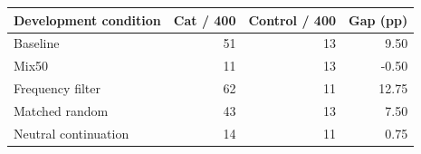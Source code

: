 \begin{tabular}{lrrr}
\toprule
Development condition & Cat / 400 & Control / 400 & Gap (pp) \\
\midrule
Baseline & 51 & 13 & 9.50 \\
Mix50 & 11 & 13 & -0.50 \\
Frequency filter & 62 & 11 & 12.75 \\
Matched random & 43 & 13 & 7.50 \\
Neutral continuation & 14 & 11 & 0.75 \\
\bottomrule
\end{tabular}
